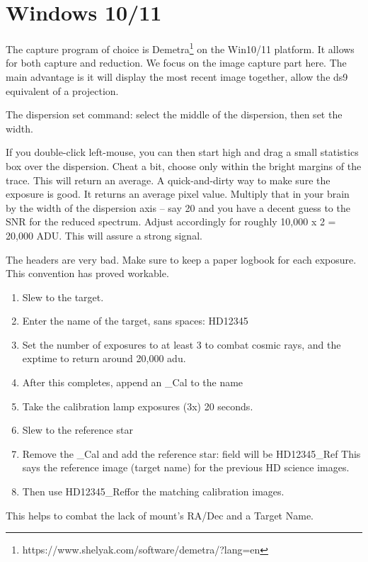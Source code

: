 \renewcommand{\footerfilename}{Win1x.tex}

\section{Windows 10/11}

The capture program of choice is Demetra\footnote{https://www.shelyak.com/software/demetra/?lang=en}
on the Win10/11 platform. It allows for both capture and reduction. We focus on the image
capture part here. The main advantage is it will display the most recent image together, allow
the ds9 equivalent of a projection. 

The dispersion set command: select the middle of the dispersion, then set the width.

If you double-click left-mouse, you can then start high and drag a small statistics
box over the dispersion. Cheat a bit, choose only within the bright margins of the
trace. This will return an average. A quick-and-dirty way to make sure the exposure
is good. It returns an average pixel value. Multiply that in your brain by the width
of the dispersion axis -- say 20 and you have a decent guess to the SNR for the reduced
spectrum. Adjust accordingly for roughly 10,000 x 2 = 20,000 ADU. This will assure
a strong signal.

The headers are very bad. Make sure to keep a paper logbook for each exposure. This
convention has proved workable.

\vspace{-.15cm}
\begin{enumerate}\addtolength{\itemsep}{-0.5\baselineskip}
   \item   Slew to the target.
   \item   Enter the name of the target, sans spaces: HD12345
   \item   Set the number of exposures to at least 3 to combat cosmic rays, and the exptime
  to return around 20,000 adu.
   \item   After this completes, append an \_Cal to the name
   \item   Take the calibration lamp exposures (3x) 20 seconds.
   \item   Slew to the reference star
   \item   Remove the \_Cal and add the reference star: field will be HD12345\_Ref
  This says the reference image (target name) for the previous HD science images.
   \item   Then use HD12345\_Ref\Cal for the matching calibration images.\end{enumerate}



This helps to combat the lack of mount's RA/Dec and a Target Name.

